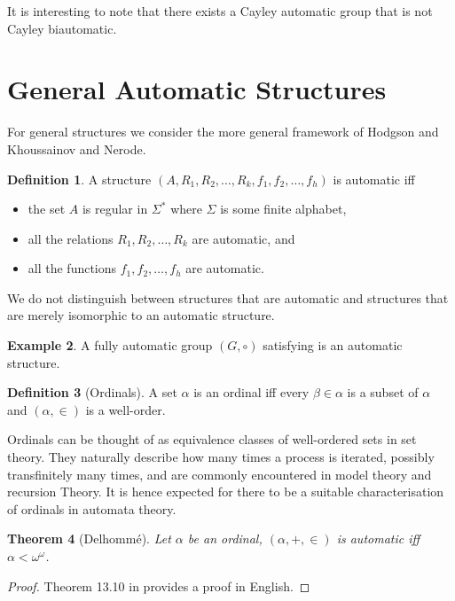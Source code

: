 \documentclass[british,a4paper,]{scrartcl}
\newtheorem{theorem}{Theorem}
\theoremstyle{definition}
\newtheorem{definition}[theorem]{Definition}
\newtheorem{example}[theorem]{Example}
\theoremstyle{remark}
\begin{document}
It is interesting to note that there exists a Cayley automatic group that is not Cayley biautomatic.
\autocite{MS}

\section{General Automatic Structures}

For general structures we consider the more general framework of
Hodgson\autocite{Ho76, Ho83} and Khoussainov and Nerode\autocite{KN}.

\begin{definition} \label{defn:automaticstructure}
    A structure \((A, R_1, R_2, \dots, R_k, f_1, f_2,\dots, f_h)\) is automatic iff
    \begin{itemize}
        \item the set \(A\) is regular in \(\Sigma^*\) where \(\Sigma\) is some finite alphabet,
        \item all the relations \(R_1, R_2, \dots, R_k\) are automatic, and
        \item all the functions \(f_1, f_2, \dots, f_h\) are automatic.
    \end{itemize}
    We do not distinguish between structures that are automatic and structures
    that are merely isomorphic to an automatic structure.
\end{definition}

\begin{example}
    A fully automatic group \((G,\circ)\) satisfying  is an automatic structure.
\end{example}

\begin{definition}[Ordinals]
    A set \(\alpha\) is an ordinal iff every \(\beta\in\alpha\) is a subset of \(\alpha\) and
    \((\alpha, \in)\) is a well-order.
\end{definition}
Ordinals can be thought of as equivalence classes of well-ordered sets in set theory.
They naturally describe how many times a process is iterated, possibly transfinitely many times, and are commonly encountered in model theory and recursion Theory.
It is hence expected for there to be a suitable characterisation of ordinals in automata theory.\autocite{delhomme}
\begin{theorem}[Delhomm\'e] \label{thm:delhomme}
    Let \(\alpha\) be an ordinal, \((\alpha, +, \in)\) is automatic iff \(\alpha < \omega^\omega\).
\end{theorem}
\begin{proof}
    Theorem 13.10 in \autocite{fullautomatatheory} provides a proof in English.
\end{proof}
\end{document}
